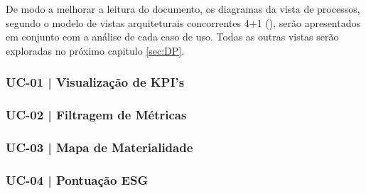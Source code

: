 De modo a melhorar a leitura do documento, os diagramas da vista de processos, segundo o modelo de vistas arquiteturais concorrentes 4+1 (\cite{Kruchten1995}), serão apresentados em conjunto com a análise de cada caso de uso. Todas as outras vistas serão exploradas no próximo capitulo \ref{sec:DP}.

\subsubsection{UC-01 | Visualização de KPI's}


\subsubsection{UC-02 | Filtragem de Métricas}


\subsubsection{UC-03 | Mapa de Materialidade}


\subsubsection{UC-04 | Pontuação ESG}


